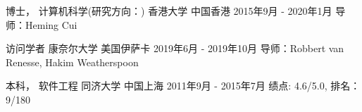 

\begin{cventries}


\cventry
{博士， 计算机科学(研究方向：)} %
{香港大学} %
{中国香港} %
{2015年9月 - 2020年1月} %
{ %
导师：Heming Cui
}


\cventry
{访问学者} %
{康奈尔大学} %
{美国伊萨卡} %
{2019年6月 - 2019年10月} %
{ %
导师：Robbert van Renesse, Hakim Weatherspoon
}


\cventry
{本科， 软件工程} %
{同济大学} %
{中国上海} %
{2011年9月 - 2015年7月} %
{ %
绩点: 4.6/5.0, 排名：9/180
}

\end{cventries}
